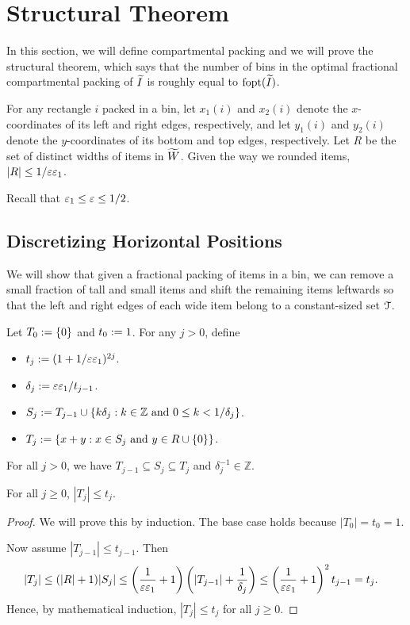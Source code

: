\section{Structural Theorem}
\label{sec:thin-bp:struct}

In this section, we will define compartmental packing
and we will prove the structural theorem, which says that
the number of bins in the optimal fractional compartmental packing of $\widetilde{I}$
is roughly equal to $\operatorname{fopt}(\widetilde{I})$.

For any rectangle $i$ packed in a bin, let $x_1(i)$ and $x_2(i)$ denote the $x$-coordinates
of its left and right edges, respectively, and let $y_1(i)$ and $y_2(i)$
denote the $y$-coordinates of its bottom and top edges, respectively.
Let $R$ be the set of distinct widths of items in $\widetilde{W}$.
Given the way we rounded items, $|R| \le 1/\varepsilon\varepsilon_1$.

Recall that $\varepsilon_1 \le \varepsilon \le 1/2$.

\subsection{Discretizing Horizontal Positions}

We will show that given a fractional packing of items in a bin,
we can remove a small fraction of tall and small items
and shift the remaining items leftwards so that the left and right edges
of each wide item belong to a constant-sized set $\mathcal{T}$.

Let $T_0 := \{0\}$ and $t_0 := 1$. For any $j > 0$, define
\begin{itemize}
\item $t_j := (1+1/\varepsilon\varepsilon_1)^{2j}$.
\item $\delta_j := \varepsilon\varepsilon_1/t_{j-1}$.
\item $S_j := T_{j-1} \cup \{k\delta_j: k \in \mathbb{Z}
    \textrm{ and } 0 \le k < 1/\delta_j\}$.
\item $T_j := \{x + y: x \in S_j \textrm{ and } y \in R \cup \{0\}\}$.
\end{itemize}

\begin{observation}
\label{obs:shift}
For all $j > 0$, we have $T_{j-1} \subseteq S_j \subseteq T_j$
and $\delta_j^{-1} \in \mathbb{Z}$.
\end{observation}

\begin{lemma}
For all $j \ge 0$, $|T_j| \le t_j$.
\end{lemma}
\begin{proof}
We will prove this by induction. The base case holds because $|T_0| = t_0 = 1$.

Now assume $|T_{j-1}| \le t_{j-1}$. Then
\begin{align*}
|T_j| &\le (|R|+1)|S_j|
    \le \left(\frac{1}{\varepsilon\varepsilon_1}+1\right)\left(|T_{j-1}| + \frac{1}{\delta_j}\right)
    \le \left(\frac{1}{\varepsilon\varepsilon_1}+1\right)^2 t_{j-1}
    = t_j.
\end{align*}
Hence, by mathematical induction, $|T_j| \le t_j$ for all $j \ge 0$.
\end{proof}

